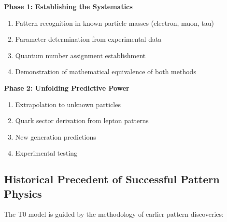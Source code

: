 	\textbf{Phase 1: Establishing the Systematics}
	\begin{enumerate}
		\item Pattern recognition in known particle masses (electron, muon, tau)
		\item Parameter determination from experimental data
		\item Quantum number assignment establishment
		\item Demonstration of mathematical equivalence of both methods
	\end{enumerate}
	
	\textbf{Phase 2: Unfolding Predictive Power}
	\begin{enumerate}
		\item Extrapolation to unknown particles
		\item Quark sector derivation from lepton patterns
		\item New generation predictions
		\item Experimental testing
	\end{enumerate}
	
	\subsection{Historical Precedent of Successful Pattern Physics}
	\label{subsec:historical_precedent}
	
	The T0 model is guided by the methodology of earlier pattern discoveries:
	
	\begin{table}[H]
		\centering
		\caption{Historical precedent of pattern physics}
		\label{tab:historical_precedent}
	\end{table}
	
